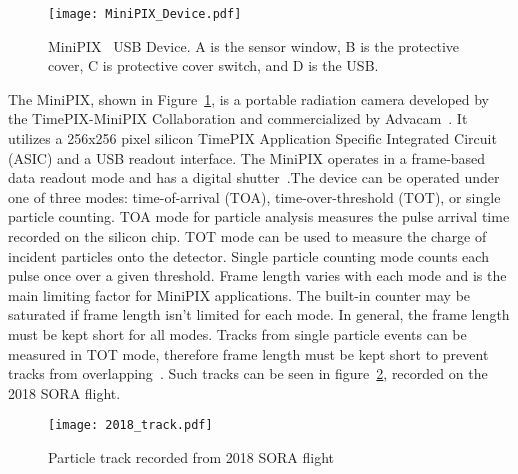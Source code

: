 %
\begin{figure}[H] %
    \centering
    \texttt{[image: MiniPIX\_Device.pdf]} 
    \caption{MiniPIX~\cite{advacam} USB Device. A is the sensor window, B is the protective cover, C is protective cover switch, and D is the USB.}
    \label{fig:minipix_usb}
\end{figure}
%
The MiniPIX, shown in Figure~\ref{fig:minipix_usb}, is a portable radiation camera developed by the TimePIX-MiniPIX Collaboration and commercialized by Advacam~\cite{advacam}.  It utilizes a 256x256 pixel silicon TimePIX Application Specific Integrated Circuit (ASIC) and a USB readout interface.   The MiniPIX operates in a frame-based data readout mode and has a digital shutter~\cite{stuartthesis}.The device can be operated under one of three modes: time-of-arrival (TOA), time-over-threshold (TOT), or single particle counting.  TOA mode for particle analysis measures the pulse arrival time recorded on the silicon chip.  TOT mode can be used to measure the charge of incident particles onto the detector.  Single particle counting mode counts each pulse once over a given threshold.  Frame length varies with each mode and is the main limiting factor for MiniPIX applications.  The built-in counter may be saturated if frame length isn't limited for each mode.  In general, the frame length must be kept short for all modes.  Tracks from single particle events can be measured in TOT mode, therefore frame length must be kept short to prevent tracks from overlapping~\cite{stuartthesis}.  Such tracks can be seen in figure~\ref{fig:sample_2018}, recorded on the 2018 SORA flight.
%
\begin{figure}[H] %
    \centering
    \texttt{[image: 2018\_track.pdf]} 
    \caption{Particle track recorded from 2018 SORA flight}
    \label{fig:sample_2018}
\end{figure}

